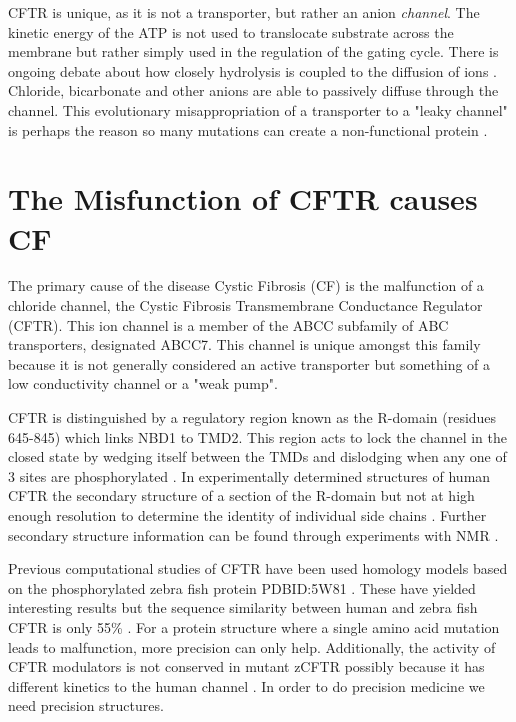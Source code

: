 CFTR is unique, as it is not a transporter, but rather an anion \textit{channel}. The kinetic energy of the ATP is not used to translocate substrate across the membrane but rather simply used in the regulation of the gating cycle. There is ongoing debate about how closely hydrolysis is coupled to the diffusion of ions \cite{}. Chloride, bicarbonate and other anions are able to passively diffuse through the channel. This evolutionary misappropriation of a transporter to a "leaky channel" is perhaps the reason so many mutations can create a non-functional protein \cite{depristo2005,linsdell2018}.

\section{The Misfunction of CFTR causes CF}

The primary cause of the disease Cystic Fibrosis (CF) is the malfunction of a chloride channel, the Cystic Fibrosis Transmembrane Conductance Regulator (CFTR). This ion channel is a member of the ABCC subfamily of ABC transporters, designated ABCC7. This channel is unique amongst this family because it is not generally considered an active transporter but something of a low conductivity channel or a "weak pump"\cite{linsdell2018}.

CFTR is distinguished by a regulatory region known as the R-domain (residues 645-845) which links NBD1 to TMD2. This region acts to lock the channel in the closed state by wedging itself between the TMDs and dislodging when any one of 3 sites are phosphorylated \cite{mihalyi2020}. In experimentally determined structures of human CFTR the secondary structure of a section of the R-domain but not at high enough resolution to determine the identity of individual side chains \cite{zhang2018, zhang2016}. Further secondary structure information can be found through experiments with NMR \cite{Baker2007}.

Previous computational studies of CFTR have been used homology models based on the phosphorylated zebra fish protein PDBID:5W81 \cite{zhang2017a}. These have yielded interesting results but the sequence similarity between human and zebra fish CFTR is only 55\% \cite{}. For a protein structure where a single amino acid mutation leads to malfunction, more precision can only help. Additionally, the activity of CFTR modulators is not conserved in mutant zCFTR possibly because it has different kinetics to the human channel \cite{}. In order to do precision medicine we need precision structures. 

